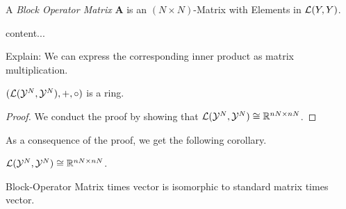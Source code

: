 \begin{definition}
	A \emph{Block Operator Matrix} $\mathbf{A}$ is an $(N \times N)$-Matrix with Elements in $\mathcal{L}(Y, Y)$.
\end{definition}

\begin{definition}[$\cY^N$]
	content... 
\end{definition}
Explain: We can express the corresponding inner product as matrix multiplication.

\begin{theorem}
	$(\mathcal{L}(\mathcal{Y}^N, \mathcal{Y}^N), +, \circ)$ is a  ring.
\end{theorem}
\begin{proof}
	We conduct the proof by showing that $\mathcal{L}(\mathcal{Y}^N, \mathcal{Y}^N) \cong \mathbb{R}^{nN \times nN}$.
\end{proof}

As a consequence of the proof, we get the following corollary.
\begin{corollary}
	\label{cor:matrix-ring-equivalence}
	$\mathcal{L}(\mathcal{Y}^N, \mathcal{Y}^N) \cong \mathbb{R}^{nN \times nN}$.
\end{corollary}

\begin{corollary}
	\label{cor:matrix-vector-equivalence}
	Block-Operator Matrix times vector is isomorphic to standard matrix times vector.
\end{corollary}



